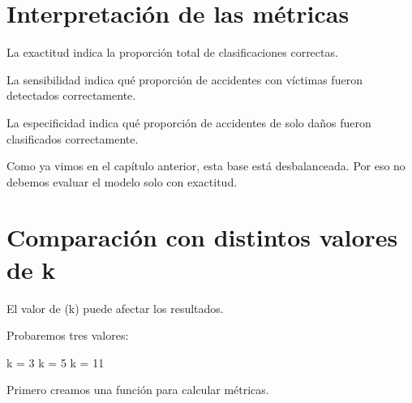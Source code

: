 \documentclass[
  11pt,
  letterpaper,
]{book}
\newenvironment{Shaded}{\begin{snugshade}}{\end{snugshade}}
\newcommand{\NormalTok}[1]{\textcolor[rgb]{0.00,0.23,0.31}{#1}}
\begin{document}
\section{Interpretación de las
métricas}\label{interpretaciuxf3n-de-las-muxe9tricas}

La exactitud indica la proporción total de clasificaciones correctas.

La sensibilidad indica qué proporción de accidentes con víctimas fueron
detectados correctamente.

La especificidad indica qué proporción de accidentes de solo daños
fueron clasificados correctamente.

Como ya vimos en el capítulo anterior, esta base está desbalanceada. Por
eso no debemos evaluar el modelo solo con exactitud.

\section{Comparación con distintos valores de
k}\label{comparaciuxf3n-con-distintos-valores-de-k}

El valor de (k) puede afectar los resultados.

Probaremos tres valores:

\begin{Shaded}
\begin{Highlighting}[]
\NormalTok{k = 3}
\NormalTok{k = 5}
\NormalTok{k = 11}
\end{Highlighting}
\end{Shaded}

Primero creamos una función para calcular métricas.
\end{document}

